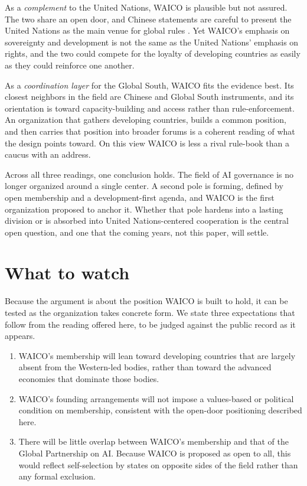 \documentclass[11pt]{article}
\begin{document}
As a \emph{complement} to the United Nations, WAICO is plausible but not assured. The two share an open door, and Chinese statements are careful to present the United Nations as the main venue for global rules \citep{basu2026pivot}. Yet WAICO's emphasis on sovereignty and development is not the same as the United Nations' emphasis on rights, and the two could compete for the loyalty of developing countries as easily as they could reinforce one another.

As a \emph{coordination layer} for the Global South, WAICO fits the evidence best. Its closest neighbors in the field are Chinese and Global South instruments, and its orientation is toward capacity-building and access rather than rule-enforcement. An organization that gathers developing countries, builds a common position, and then carries that position into broader forums is a coherent reading of what the design points toward. On this view WAICO is less a rival rule-book than a caucus with an address.

Across all three readings, one conclusion holds. The field of AI governance is no longer organized around a single center. A second pole is forming, defined by open membership and a development-first agenda, and WAICO is the first organization proposed to anchor it. Whether that pole hardens into a lasting division or is absorbed into United Nations-centered cooperation is the central open question, and one that the coming years, not this paper, will settle.

\section{What to watch}
Because the argument is about the position WAICO is built to hold, it can be tested as the organization takes concrete form. We state three expectations that follow from the reading offered here, to be judged against the public record as it appears.

\begin{enumerate}
\item[\textbf{1.}] WAICO's membership will lean toward developing countries that are largely absent from the Western-led bodies, rather than toward the advanced economies that dominate those bodies.
\item[\textbf{2.}] WAICO's founding arrangements will not impose a values-based or political condition on membership, consistent with the open-door positioning described here.
\item[\textbf{3.}] There will be little overlap between WAICO's membership and that of the Global Partnership on AI. Because WAICO is proposed as open to all, this would reflect self-selection by states on opposite sides of the field rather than any formal exclusion.
\end{enumerate}
\end{document}
